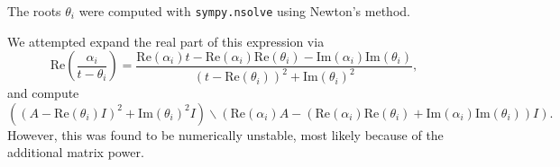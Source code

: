 The roots $\theta_i$ were computed with \texttt{sympy.nsolve} using Newton's
method.

We attempted expand the real part of this expression via
\begin{equation}
\mathrm{Re}\left(\frac{\alpha_i}{t - \theta_i}\right) = \frac{\mathrm{Re}{(\alpha_{i})}t - \mathrm{Re}{(\alpha_{i})} \mathrm{Re}{(\theta_{i})} - \mathrm{Im}{(\alpha_{i})} \mathrm{Im}{(\theta_{i})}}{\left(t - \mathrm{Re}{(\theta_{i})}\right)^{2} + \mathrm{Im}{(\theta_{i})}^{2}},
\end{equation}
and compute
\begin{equation}
\left(\left(A - \mathrm{Re}{(\theta_{i})I}\right)^{2} +
  \mathrm{Im}{(\theta_{i})}^{2}I\right)\backslash \left(\mathrm{Re}{(\alpha_{i})}A - (\mathrm{Re}{(\alpha_{i})} \mathrm{Re}{(\theta_{i})} + \mathrm{Im}{(\alpha_{i})} \mathrm{Im}{(\theta_{i})})I\right).
\end{equation}
However, this was found to be numerically unstable, most likely because of the
additional matrix power.
